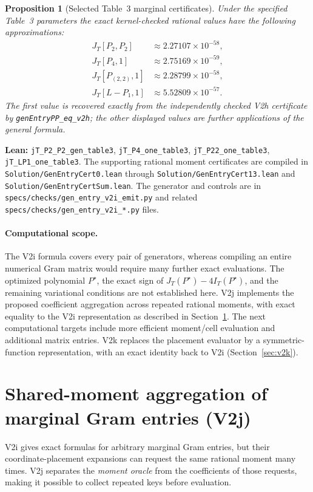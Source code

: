 \documentclass[11pt]{article}
\newtheorem{proposition}[theorem]{Proposition}
\newcommand{\code}[1]{\texttt{#1}}
\begin{document}
\begin{proposition}[Selected Table~3 marginal certificates]\label{prop:genentrycert}
Under the specified Table~3 parameters the exact kernel-checked rational
values have the following approximations:
\[
\begin{aligned}
 J_T[P_2,P_2]        &\approx 2.27107\times10^{-58},\\
 J_T[P_4,1]          &\approx 2.75169\times10^{-59},\\
 J_T[P_{(2,2)},1]    &\approx 2.28799\times10^{-58},\\
 J_T[L-P_1,1]        &\approx 5.52809\times10^{-57}.
\end{aligned}
\]
The first value is recovered exactly from the independently checked V2h
certificate by \code{genEntryPP\_eq\_v2h}; the other displayed values
are further applications of the general formula.
\end{proposition}
\noindent\textbf{Lean:} \code{jT\_P2\_P2\_gen\_table3},
\code{jT\_P4\_one\_table3}, \code{jT\_P22\_one\_table3},
\code{jT\_LP1\_one\_table3}.
The supporting rational moment certificates are compiled in
\nolinkurl{Solution/GenEntryCert0.lean} through
\nolinkurl{Solution/GenEntryCert13.lean} and
\nolinkurl{Solution/GenEntryCertSum.lean}. The generator and controls
are in \nolinkurl{specs/checks/gen_entry_v2i_emit.py} and related
\nolinkurl{specs/checks/gen_entry_v2i_*.py} files.

\paragraph{Computational scope.}
The V2i formula covers every pair of generators, whereas compiling an
entire numerical Gram matrix would require many further exact evaluations.
The optimized polynomial $P^\star$, the exact sign of
$J_T(P^\star)-4I_T(P^\star)$, and the remaining variational conditions
are not established here. V2j implements the proposed coefficient aggregation across repeated rational
moments, with exact equality to the V2i representation as described in
Section~\ref{sec:v2j}. The next computational targets include more efficient
moment/cell evaluation and additional matrix entries. V2k replaces the
placement evaluator by a symmetric-function representation, with an exact
identity back to V2i (Section~\ref{sec:v2k}).


\section{Shared-moment aggregation of marginal Gram entries (V2j)}\label{sec:v2j}
V2i gives exact formulas for arbitrary marginal Gram entries, but their
coordinate-placement expansions can request the same rational moment many
times. V2j separates the \emph{moment oracle} from the coefficients of those
requests, making it possible to collect repeated keys before evaluation.
\end{document}
